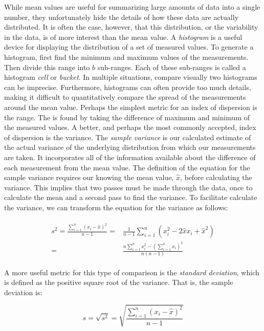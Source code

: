 \documentclass[openany, a4paper]{book}
\theoremstyle{plain}
\theoremstyle{definition}
\theoremstyle{remark}
\begin{document}
While mean values are useful for summarizing large amounts of data into a
single number, they unfortunately hide the details of how these data are
actually distributed. It is often the case, however, that this distribution,
or the variability in the data, is of more interest than the mean value. A
\emph{histogram} is a useful device for displaying the distribution of a set of
measured values. To generate a histogram, first find the minimum and maximum
values of the measurements. Then divide this range into \(b\)
sub-ranges. Each of these sub-ranges is called a histogram \emph{cell} or \emph{bucket}. In
multiple situations, compare visually two histograms can be
imprecise. Furthermore, histograms can often provide too much details, making
it difficult to quantitatively compare the spread of the measurements around
the mean value. Perhaps the simplest metric for an index of dispersion is the
range. The is found by taking the difference of maximum and minimum of the
measured values. A better, and perhaps the most commonly accepted, index of
dispersion is the variance. The \emph{sample variance} is our calculated estimate of
the actual variance of the underlying distribution from which our
measurements are taken. It incorporates all of the information available
about the difference of each measurement from the mean value. The definition
of the equation for the sample variance requires our knowing the mean value,
\(\hat{x}\), before calculating the variance. This implies that two passes
must be made through the data, once to calculate the mean and a second pass
to find the variance. To facilitate calculate the variance, we can transform
the equation for the variance as follows:

\begin{align}
\begin{split}
  s^2 = \frac{\sum^n_{i = 1}(x_i - \hat{x})^2}{n - 1} = & \frac{1}{n - 1}\sum^n_{i = 1}(x_i^2-2\hat{x}x_i + \hat{x}^2)\\
  = & \frac{n\sum^n_{i = 1}x_i^2 - (\sum^n_{i = 1}x_i)^2}{n(n-1)}
\end{split}
\end{align}

A more useful metric for this type of comparison is the \emph{standard deviation},
which is defined as the positive square root of the variance. That is, the
sample deviation is:

\begin{equation}
  s = \sqrt{s^2} = \sqrt{\frac{\sum_{i=1}^n (x_i - \hat{x})^2}{n - 1}}
\end{equation}
\end{document}
